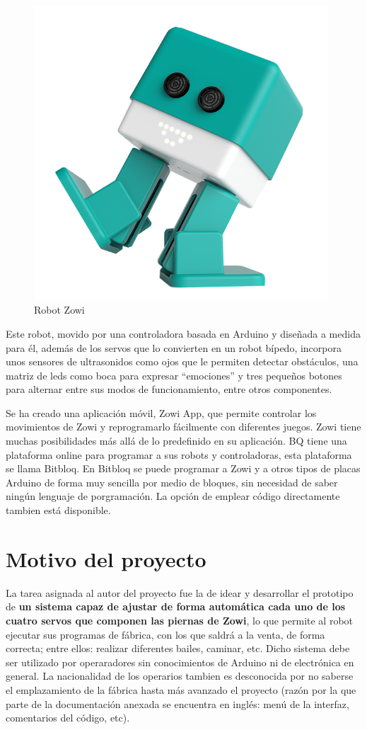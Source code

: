 \begin{figure}[h]
\centering
\includegraphics[width=110mm]{Figures/zowi-img.png}
\caption[Robot Zowi]{Robot Zowi}
\label{fig:Zowi-img}
\end{figure}

Este robot, movido por una controladora basada en Arduino y diseñada a medida para él, además de los servos que lo convierten en un robot bípedo, incorpora unos sensores de ultrasonidos como ojos que le permiten detectar obstáculos, una matriz de leds como boca para expresar ``emociones'' y tres pequeños botones para alternar entre sus modos de funcionamiento, entre otros componentes.

Se ha creado una aplicación móvil, Zowi App, que permite controlar los movimientos de Zowi y reprogramarlo fácilmente con diferentes juegos. Zowi tiene muchas posibilidades más allá de lo predefinido en su aplicación. BQ tiene una plataforma online para programar a sus robots y controladoras, esta plataforma se llama Bitbloq. En Bitbloq se puede programar a Zowi y a otros tipos de placas Arduino de forma muy sencilla por medio de bloques, sin necesidad de saber ningún lenguaje de porgramación. La opción de emplear código directamente tambien está disponible.

\section{Motivo del proyecto}
La tarea asignada al autor del proyecto fue la de idear y desarrollar el prototipo de \textbf{un sistema capaz de ajustar de forma automática cada uno de los cuatro servos que componen las piernas de Zowi}, lo que permite al robot ejecutar sus programas de fábrica, con los que saldrá a la venta, de forma correcta; entre ellos: realizar diferentes bailes, caminar, etc. Dicho sistema debe ser utilizado por operaradores sin conocimientos de Arduino ni de electrónica en general. La nacionalidad de los operarios tambien es desconocida por no saberse el emplazamiento de la fábrica hasta más avanzado el proyecto (razón por la que parte de la documentación anexada se encuentra en inglés: menú de la interfaz, comentarios del código, etc).

